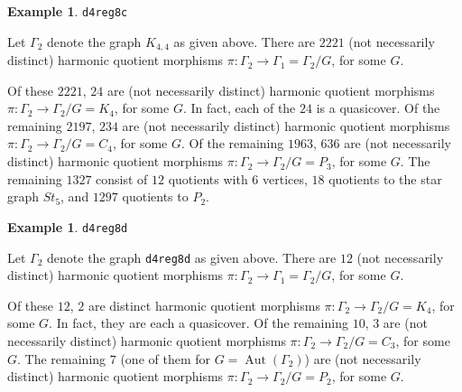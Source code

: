 \documentclass[12pt,letterpaper]{article}
\theoremstyle{definition}
\newtheorem{example}[theorem]{Example}
\DeclareMathOperator{\Aut}{Aut}
\begin{document}
\begin{example}%
\label{example:d4reg8c}
 {\tt d4reg8c}\newline
{\rm  
  Let $\Gamma_2$ denote the graph $K_{4,4}$ as given above.
There are $2221$ (not necessarily distinct) harmonic quotient morphisms
$\pi: \Gamma_2\to \Gamma_1=\Gamma_2/G$,
for some $G$.

Of these $2221$, $24$ are (not necessarily distinct) harmonic quotient morphisms
$\pi: \Gamma_2\to \Gamma_2/G = K_4$, for some $G$. In fact, each of the $24$ is a quasicover.
Of the remaining $2197$, $234$ are (not necessarily distinct) harmonic quotient morphisms
$\pi: \Gamma_2\to \Gamma_2/G = C_4$, for some $G$.
Of the remaining $1963$, $636$ are (not necessarily distinct) harmonic quotient morphisms
$\pi: \Gamma_2\to \Gamma_2/G = P_3$, for some $G$.
The remaining $1327$ consist of $12$ quotients with $6$ vertices,
$18$ quotients to the star graph $St_5$, and $1297$ quotients to $P_2$.
}
\end{example}




\begin{example}%
\label{example:d4reg8d}
 {\tt d4reg8d}\newline
{\rm  
  Let $\Gamma_2$ denote the graph {\tt d4reg8d} as given above.
There are $12$ (not necessarily distinct) harmonic quotient morphisms
$\pi: \Gamma_2\to \Gamma_1=\Gamma_2/G$,
for some $G$.

Of these $12$, $2$ are distinct harmonic quotient morphisms
$\pi: \Gamma_2\to \Gamma_2/G = K_4$, for some $G$. In fact, they are each a quasicover.
Of the remaining $10$, $3$ are (not necessarily distinct) harmonic quotient morphisms
$\pi: \Gamma_2\to \Gamma_2/G = C_3$, for some $G$.
The remaining $7$ (one of them for $G=\Aut(\Gamma_2)$) are (not necessarily distinct) harmonic quotient morphisms
$\pi: \Gamma_2\to \Gamma_2/G = P_2$, for some $G$.
}
\end{example}
\end{document}
